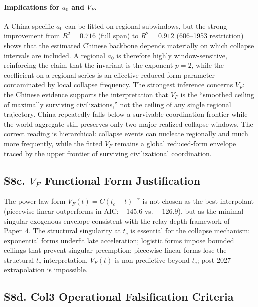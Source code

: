 \documentclass[11pt]{article}
\begin{document}
\paragraph{Implications for $a_0$ and $V_F$.}
A China-specific $a_0$ can be fitted on regional subwindows, but the strong improvement from $R^2=0.716$ (full span) to $R^2=0.912$ (606--1953 restriction) shows that the estimated Chinese backbone depends materially on which collapse intervals are included.
A regional $a_0$ is therefore highly window-sensitive, reinforcing the claim that the invariant is the exponent $p=2$, while the coefficient on a regional series is an effective reduced-form parameter contaminated by local collapse frequency.
The strongest inference concerns $V_F$: the Chinese evidence supports the interpretation that $V_F$ is the ``smoothed ceiling of maximally surviving civilizations,'' not the ceiling of any single regional trajectory.
China repeatedly falls below a survivable coordination frontier while the world aggregate still preserves only two major realized collapse windows.
The correct reading is hierarchical: collapse events can nucleate regionally and much more frequently, while the fitted $V_F$ remains a global reduced-form envelope traced by the upper frontier of surviving civilizational coordination.

\subsection*{S8c. $V_F$ Functional Form Justification}

The power-law form $V_F(t)=C(t_c-t)^{-\alpha}$ is not chosen as the best interpolant
(piecewise-linear outperforms in AIC: $-145.6$ vs.\ $-126.9$), but as the minimal singular
exogenous envelope consistent with the relay-depth framework of Paper~4.
The structural singularity at $t_c$ is essential for the collapse mechanism:
exponential forms underfit late acceleration; logistic forms impose bounded ceilings
that prevent singular preemption; piecewise-linear forms lose the structural $t_c$ interpretation.
$V_F(t)$ is non-predictive beyond $t_c$; post-2027 extrapolation is impossible.

\subsection*{S8d. Col3 Operational Falsification Criteria}
\end{document}
